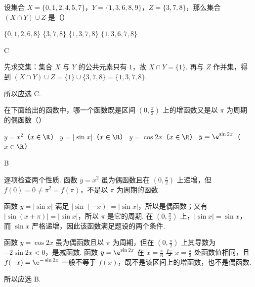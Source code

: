 \begin{problem}

设集合 \(X = \{0,1,2,4,5,7\}\)，\(Y = \{1,3,6,8,9\}\)，\(Z = \{3,7,8\}\)，那么集合 \((X \cap Y) \cup Z\) 是（\quad）

\choices
    {\(\{0,1,2,6,8\}\)}
    {\(\{3,7,8\}\)}
    {\(\{1,3,7,8\}\)}
    {\(\{1,3,6,7,8\}\)}

\begin{answer}
C
\end{answer}

\begin{solution}
先求交集：集合 \(X\) 与 \(Y\) 的公共元素只有 \(1\)，故
\(X\cap Y=\{1\}\). 再与 \(Z\) 作并集，得到
\((X\cap Y)\cup Z=\{1\}\cup\{3,7,8\}=\{1,3,7,8\}\).

所以应选 C.
\end{solution}
\end{problem}

\begin{problem}

在下面给出的函数中，哪一个函数既是区间 \(\left(0,\frac{\pi}{2}\right)\) 上的增函数又是以 \(\pi\) 为周期的偶函数（\quad）

\choices
    {\(y=x^{2}\)（\(x\in\R\)）}
    {\(y=|\sin x|\)（\(x\in\R\)）}
    {\(y=\cos 2x\)（\(x\in\R\)）}
    {\(y=\e^{\sin 2x}\)（\(x\in\R\)）}

\begin{answer}
B
\end{answer}

\begin{solution}
逐项检查两个性质. 函数 \(y=x^2\) 虽为偶函数且在 \(\left(0,\frac{\pi}{2}\right)\) 上递增，但 \(f(0)=0\ne\pi^2=f(\pi)\)，不是以 \(\pi\) 为周期的函数.

函数 \(y=|\sin x|\) 满足 \(|\sin(-x)|=|\sin x|\)，所以是偶函数；又有 \(|\sin(x+\pi)|=|\sin x|\)，所以 \(\pi\) 是它的周期. 在 \(\left(0,\frac{\pi}{2}\right)\) 上，\(|\sin x|=\sin x\)，而 \(\sin x\) 严格递增，因此该函数满足题设的两个条件.

函数 \(y=\cos 2x\) 虽为偶函数且以 \(\pi\) 为周期，但在 \(\left(0,\frac{\pi}{2}\right)\) 上其导数为 \(-2\sin 2x<0\)，是减函数. 函数 \(y=\e^{\sin 2x}\) 在 \(x=\frac{\pi}{6}\) 与 \(x=\frac{\pi}{3}\) 处函数值相同，且 \(f(-x)=\e^{-\sin 2x}\) 一般不等于 \(f(x)\)，既不是该区间上的增函数，也不是偶函数.

所以应选 B.
\end{solution}
\end{problem}

